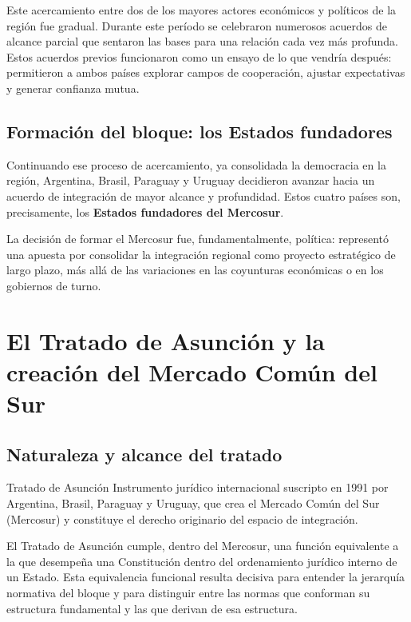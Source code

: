\documentclass[12pt,oneside]{book}
\begin{document}
Este acercamiento entre dos de los mayores actores económicos y políticos de la región fue gradual. Durante este período se celebraron numerosos acuerdos de alcance parcial que sentaron las bases para una relación cada vez más profunda. Estos acuerdos previos funcionaron como un ensayo de lo que vendría después: permitieron a ambos países explorar campos de cooperación, ajustar expectativas y generar confianza mutua.

\section{Formación del bloque: los Estados fundadores}

Continuando ese proceso de acercamiento, ya consolidada la democracia en la región, Argentina, Brasil, Paraguay y Uruguay decidieron avanzar hacia un acuerdo de integración de mayor alcance y profundidad. Estos cuatro países son, precisamente, los \textbf{Estados fundadores del Mercosur}.

\begin{important}
La decisión de formar el Mercosur fue, fundamentalmente, política: representó una apuesta por consolidar la integración regional como proyecto estratégico de largo plazo, más allá de las variaciones en las coyunturas económicas o en los gobiernos de turno.
\end{important}

\chapter{El Tratado de Asunción y la creación del Mercado Común del Sur}

\section{Naturaleza y alcance del tratado}

\begin{definition}{Tratado de Asunción}
Instrumento jurídico internacional suscripto en 1991 por Argentina, Brasil, Paraguay y Uruguay, que crea el Mercado Común del Sur (Mercosur) y constituye el derecho originario del espacio de integración.
\end{definition}

El Tratado de Asunción cumple, dentro del Mercosur, una función equivalente a la que desempeña una Constitución dentro del ordenamiento jurídico interno de un Estado. Esta equivalencia funcional resulta decisiva para entender la jerarquía normativa del bloque y para distinguir entre las normas que conforman su estructura fundamental y las que derivan de esa estructura.
\end{document}
